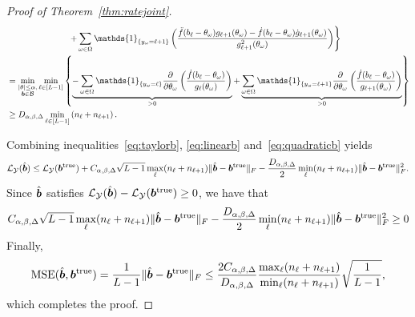 \documentclass[11pt]{article}
\theoremstyle{plain}
\theoremstyle{definition}
\newcommand*{\KeepStyleUnderBrace}[1]{%
 \mathop{%
    \mathchoice
    {\underbrace{\displaystyle#1}}%
    {\underbrace{\textstyle#1}}%
    {\underbrace{\scriptstyle#1}}%
    {\underbrace{\scriptscriptstyle#1}}%
  }\limits
}
\begin{document}
\begin{proof}[Proof of Theorem~\ref{thm:ratejoint}]
\begin{align}
&\left. \hspace{1in}+\sum_{\omega\in\Omega}\mathds{1}_{\{y_\omega=\ell+1\}} \left( {\ddot{f}(b_\ell-\theta_\omega) g_{\ell+1}(\theta_\omega) - \dot{f}(b_\ell-\theta_\omega)\dot{g}_{\ell+1} (\theta_\omega)\over g^2_{\ell+1}(\theta_\omega)} \right)\right\}\\
&=\min_{\substack{|\theta|\leq \alpha,\\ \mb\in\tB}} \min_{\ell\in[L-1]}\left\{\KeepStyleUnderBrace{-\sum_{\omega\in\Omega} \mathds{1}_{\{y_\omega=\ell\}}{\partial \over \partial \theta_\omega}\left( \dot{f}(b_\ell-\theta_\omega) \over g_\ell(\theta_\omega) \right)}_{>0}+\KeepStyleUnderBrace{\sum_{\omega\in\Omega}\mathds{1}_{\{y_\omega=\ell+1\}} {\partial \over \partial \theta_\omega}\left( \dot{f}(b_\ell-\theta_\omega) \over g_{\ell+1}(\theta_\omega) \right) }_{>0}\right\}\\
&\geq D_{\alpha,\beta,\Delta}  \min_{\ell\in[L-1]}\left(n_{\ell}+n_{\ell+1}\right) .
\end{align}

Combining inequalities~\eqref{eq:taylorb}, \eqref{eq:linearb} and~\eqref{eq:quadraticb} yields
\[
\mathcal{L}_{\mathcal{Y}}(\hat {\bm{b}})\leq \mathcal{L}_{\mathcal{Y}}(\bm{b}^{\text{true}})+C_{\alpha,\beta,\Delta}\sqrt{L-1}\max_{\ell}(n_\ell+n_{\ell+1}) \lVert\hat{\bm{b}}-\bm{b}^{\text{true}}\rVert_F -\frac{D_{\alpha,\beta,\Delta}}{2}\min_{\ell}(n_\ell+n_{\ell+1}) \lVert\hat{\bm{b}}-\bm{b}^{\text{true}}\rVert_F^2 .
\]
Since $\hat {\bm{b}}$ satisfies $\mathcal{L}_{\mathcal{Y}}(\hat {\bm{b}})-\mathcal{L}_{\mathcal{Y}}(\bm{b}^{\text{true}})\geq 0$, we have that
\[
C_{\alpha,\beta,\Delta}\sqrt{L-1}\max_{\ell}(n_\ell+n_{\ell+1}) \lVert\hat{\bm{b}}-\bm{b}^{\text{true}}\rVert_F -\frac{D_{\alpha,\beta,\Delta}}{2}\min_{\ell}(n_\ell+n_{\ell+1}) \lVert\hat{\bm{b}}-\bm{b}^{\text{true}}\rVert_F^2\geq 0
\]
Finally,
\[
\text{MSE}(\hat {\bm{b}},\bm{b}^{\text{true}})={1\over L-1}\lVert\hat{\bm{b}}-\bm{b}^{\text{true}}\rVert_F\leq {2C_{\alpha,\beta,\Delta} \over D_{\alpha,\beta,\Delta}}{\max_{\ell}(n_\ell+n_{\ell+1})\over \min_{\ell}(n_{\ell}+n_{\ell+1})}  \sqrt{1\over L-1},
\]
which completes the proof.
\end{proof}
\end{document}
